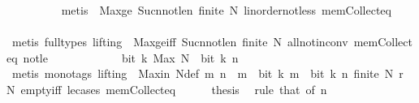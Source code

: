 \begin{isabellebody}
\ \ \ \ \ \ \ \ \isamarkupfalse%
\ {\isacharparenleft}{\kern0pt}metis\ {\isachardoublequoteopen}{\isacharasterisk}{\kern0pt}{\isachardoublequoteclose}\ Max{\isacharunderscore}{\kern0pt}ge\ Suc{\isacharunderscore}{\kern0pt}n{\isacharunderscore}{\kern0pt}not{\isacharunderscore}{\kern0pt}le{\isacharunderscore}{\kern0pt}n\ {\isacartoucheopen}finite\ N{\isacartoucheclose}\ linorder{\isacharunderscore}{\kern0pt}not{\isacharunderscore}{\kern0pt}less\ mem{\isacharunderscore}{\kern0pt}Collect{\isacharunderscore}{\kern0pt}eq{\isacharparenright}{\kern0pt}\isanewline
\ \ \ \ \ \ \isamarkupfalse%
\ {\isacharparenleft}{\kern0pt}metis\ {\isacharparenleft}{\kern0pt}full{\isacharunderscore}{\kern0pt}types{\isacharcomma}{\kern0pt}\ lifting{\isacharparenright}{\kern0pt}\ {\isachardoublequoteopen}{\isacharasterisk}{\kern0pt}{\isachardoublequoteclose}\ Max{\isacharunderscore}{\kern0pt}ge{\isacharunderscore}{\kern0pt}iff\ Suc{\isacharunderscore}{\kern0pt}n{\isacharunderscore}{\kern0pt}not{\isacharunderscore}{\kern0pt}le{\isacharunderscore}{\kern0pt}n\ {\isacartoucheopen}finite\ N{\isacartoucheclose}\ all{\isacharunderscore}{\kern0pt}not{\isacharunderscore}{\kern0pt}in{\isacharunderscore}{\kern0pt}conv\ mem{\isacharunderscore}{\kern0pt}Collect{\isacharunderscore}{\kern0pt}eq\ not{\isacharunderscore}{\kern0pt}le{\isacharparenright}{\kern0pt}\isanewline
\ \ \ \ \ \ \isamarkupfalse%
\isanewline
\ \ \ \ \isamarkupfalse%
\ {\isacartoucheopen}bit\ k\ {\isacharparenleft}{\kern0pt}Max\ N{\isacharparenright}{\kern0pt}\ {\isasymnoteq}\ bit\ k\ n{\isacartoucheclose}\isanewline
\ \ \ \ \ \ \isamarkupfalse%
\ {\isacharparenleft}{\kern0pt}metis\ {\isacharparenleft}{\kern0pt}mono{\isacharunderscore}{\kern0pt}tags{\isacharcomma}{\kern0pt}\ lifting{\isacharparenright}{\kern0pt}\ {\isachardoublequoteopen}{\isacharasterisk}{\kern0pt}{\isachardoublequoteclose}\ Max{\isacharunderscore}{\kern0pt}in\ N{\isacharunderscore}{\kern0pt}def\ {\isacartoucheopen}{\isasymAnd}m{\isachardot}{\kern0pt}\ n\ {\isasymle}\ m\ {\isasymLongrightarrow}\ bit\ k\ m\ {\isacharequal}{\kern0pt}\ bit\ k\ n{\isacartoucheclose}\ {\isacartoucheopen}finite\ N{\isacartoucheclose}\ {\isacartoucheopen}r\ {\isasymin}\ N{\isacartoucheclose}\ empty{\isacharunderscore}{\kern0pt}iff\ le{\isacharunderscore}{\kern0pt}cases\ mem{\isacharunderscore}{\kern0pt}Collect{\isacharunderscore}{\kern0pt}eq{\isacharparenright}{\kern0pt}\isanewline
\ \ \ \ \isamarkupfalse%
\ thesis\ \isamarkupfalse%
\ {\isacharparenleft}{\kern0pt}rule\ that\ {\isacharbrackleft}{\kern0pt}of\ n{\isacharbrackright}{\kern0pt}{\isacharparenright}{\kern0pt}\isanewline

\end{isabellebody}
